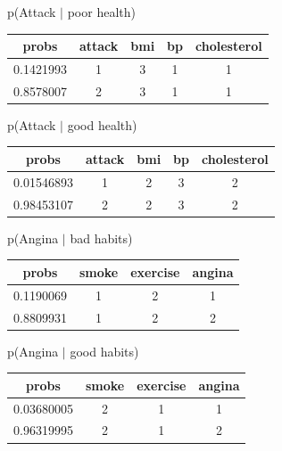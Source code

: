 \documentclass[11pt]{article}
\begin{document}

p(Attack $|$ poor health)

\begin{table}[!hbt]
\begin{center}
\begin{tabular}{ |c|c|c|c|c| }
  \hline
  probs & attack & bmi & bp & cholesterol \\
  \hline
  0.1421993 & 1 & 3 & 1 & 1\\
  \hline
  0.8578007 & 2 & 3 & 1 & 1 \\
  \hline
\end{tabular}
\end{center}
\end{table}
\vspace{-20pt}


p(Attack $|$ good health)

\begin{table}[!hbt]
\begin{center}
\begin{tabular}{ |c|c|c|c|c| }
  \hline
  probs & attack & bmi & bp & cholesterol \\
  \hline
  0.01546893 & 1 & 2 & 3 & 2\\
  \hline
  0.98453107 & 2 & 2 & 3 & 2 \\
  \hline
\end{tabular}
\end{center}
\end{table}
\vspace{-20pt}

p(Angina $|$ bad habits)

\begin{table}[!hbt]
\begin{center}
\begin{tabular}{ |c|c|c|c| }
  \hline
  probs & smoke & exercise & angina \\
  \hline
 0.1190069 & 1 & 2 & 1 \\
  \hline
 0.8809931  & 1 & 2 & 2 \\
  \hline
\end{tabular}
\end{center}
\end{table}
\vspace{-20pt}

p(Angina $|$ good habits)

\begin{table}[!hbt]
\begin{center}
\begin{tabular}{ |c|c|c|c| }
  \hline
  probs & smoke & exercise & angina \\
  \hline
 0.03680005 & 2 & 1 & 1 \\
  \hline
 0.96319995 & 2 & 1 & 2 \\
  \hline
\end{tabular}
\end{center}
\end{table}
\vspace{-20pt}
\end{document}
